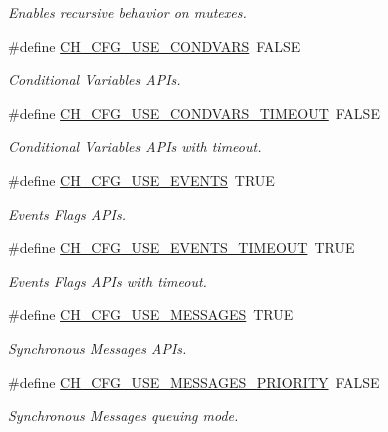 \begin{DoxyCompactItemize}
\begin{DoxyCompactList}\small\item\em Enables recursive behavior on mutexes. \end{DoxyCompactList}\item 
\#define \hyperlink{group__config_ga73bc5a9da32221b5dd7759eed02a11fc}{C\+H\+\_\+\+C\+F\+G\+\_\+\+U\+S\+E\+\_\+\+C\+O\+N\+D\+V\+A\+RS}~F\+A\+L\+SE
\begin{DoxyCompactList}\small\item\em Conditional Variables A\+P\+Is. \end{DoxyCompactList}\item 
\#define \hyperlink{group__config_gae286dae62e72f6bd17ecfbd69194b1bb}{C\+H\+\_\+\+C\+F\+G\+\_\+\+U\+S\+E\+\_\+\+C\+O\+N\+D\+V\+A\+R\+S\+\_\+\+T\+I\+M\+E\+O\+UT}~F\+A\+L\+SE
\begin{DoxyCompactList}\small\item\em Conditional Variables A\+P\+Is with timeout. \end{DoxyCompactList}\item 
\#define \hyperlink{group__config_ga1469eb9d4445e870ed1a45a841c10fb3}{C\+H\+\_\+\+C\+F\+G\+\_\+\+U\+S\+E\+\_\+\+E\+V\+E\+N\+TS}~T\+R\+UE
\begin{DoxyCompactList}\small\item\em Events Flags A\+P\+Is. \end{DoxyCompactList}\item 
\#define \hyperlink{group__config_gad39f51eec096df2b73444e8fad5cfd11}{C\+H\+\_\+\+C\+F\+G\+\_\+\+U\+S\+E\+\_\+\+E\+V\+E\+N\+T\+S\+\_\+\+T\+I\+M\+E\+O\+UT}~T\+R\+UE
\begin{DoxyCompactList}\small\item\em Events Flags A\+P\+Is with timeout. \end{DoxyCompactList}\item 
\#define \hyperlink{group__config_ga10585bbb78d4b11d82814f38181e5a3a}{C\+H\+\_\+\+C\+F\+G\+\_\+\+U\+S\+E\+\_\+\+M\+E\+S\+S\+A\+G\+ES}~T\+R\+UE
\begin{DoxyCompactList}\small\item\em Synchronous Messages A\+P\+Is. \end{DoxyCompactList}\item 
\#define \hyperlink{group__config_gaa65eccee8e56f16bccf3709c23f7ac57}{C\+H\+\_\+\+C\+F\+G\+\_\+\+U\+S\+E\+\_\+\+M\+E\+S\+S\+A\+G\+E\+S\+\_\+\+P\+R\+I\+O\+R\+I\+TY}~F\+A\+L\+SE
\begin{DoxyCompactList}\small\item\em Synchronous Messages queuing mode. \end{DoxyCompactList}\item 

\end{DoxyCompactItemize}

